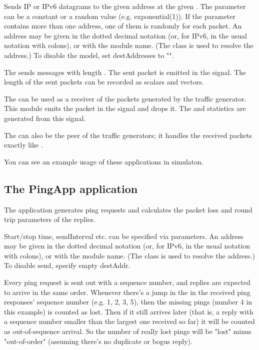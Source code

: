 Sends IP or IPv6 datagrams to the given address at the given .
The  parameter can be a constant or a random value (e.g. exponential(1)).
If the  parameter contains more than one address, one
of them is randomly for each packet. An address may be given in the
dotted decimal notation (or, for IPv6, in the usual notation with colons),
or with the module name. (The  class is used to resolve
the address.) To disable the model, set destAddresses to "".

The  sends messages with length .
The sent packet is emitted in the  signal.
The length of the sent packets can be recorded as scalars and vectors.


The  can be used as a receiver of the packets
generated by the traffic generator. This module emits the packet
in the  signal and drops it. The 
and  statistics are generated from this signal.

The  can also be the peer of the traffic generators;
it handles the received packets exactly like .

You can see an example usage of these applications in 
simulaton.

\subsection{The PingApp application}

The  application
generates ping requests and calculates the packet loss and round trip
parameters of the replies.

Start/stop time, sendInterval etc. can be specified via parameters. An address
may be given in the dotted decimal notation (or, for IPv6, in the usual
notation with colons), or with the module name.
(The  class is used to resolve the address.)
To disable send, specify empty destAddr.

Every ping request is sent out with a sequence number, and replies are
expected to arrive in the same order. Whenever there's a jump in the
in the received ping responses' sequence number (e.g. 1, 2, 3, 5), then
the missing pings (number 4 in this example) is counted as lost.
Then if it still arrives later (that is, a reply with a sequence number
smaller than the largest one received so far) it will be counted as
out-of-sequence arrival. So the number of really lost pings will be
"lost" minus "out-of-order" (assuming there's no duplicate or bogus reply).

